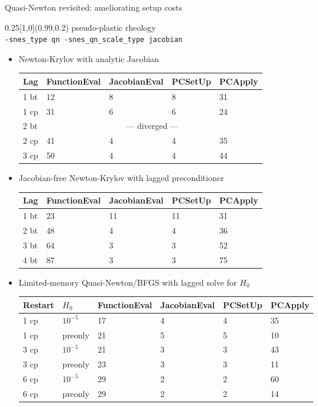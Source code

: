 \begin{frame}[shrink=5]{Quasi-Newton revisited: ameliorating setup costs}
  \begin{textblock}{0.25}[1,0](0.99,0.2)
    {\small pseudo-plastic rheology} \\
    {\scriptsize
      \texttt{-snes\_type qn
        -snes\_qn\_scale\_type jacobian}}
  \end{textblock}

    \begin{itemize}
    \item Newton-Krylov with analytic Jacobian
{\footnotesize
      \begin{tabular}{lllll}
        \toprule
        Lag & FunctionEval & JacobianEval & PCSetUp & PCApply \\
        \midrule
        1 bt & 12 & 8 & 8 & 31 \\
        1 cp & 31 & 6 & 6 & 24 \\
        2 bt & \multicolumn{4}{c}{--- diverged ---} \\
        2 cp & 41 & 4 & 4 & 35 \\
        3 cp & 50 & 4 & 4 & 44 \\
        \bottomrule
      \end{tabular}
}
    \item Jacobian-free Newton-Krylov with lagged preconditioner
{\footnotesize
      \begin{tabular}{lllll}
        \toprule
        Lag & FunctionEval & JacobianEval & PCSetUp & PCApply \\
        \midrule
        1 bt & 23 & 11 & 11 & 31 \\
        2 bt & 48 & 4 & 4 & 36 \\
        3 bt & 64 & 3 & 3 & 52 \\
        4 bt & 87 & 3 & 3 & 75 \\
        \bottomrule
      \end{tabular}
}
    \item Limited-memory Quasi-Newton/BFGS with lagged solve for $H_0$
{\footnotesize
      \begin{tabular}{llllll}
        \toprule
        Restart & $H_0$ & FunctionEval & JacobianEval & PCSetUp & PCApply \\
        \midrule
        1 cp & $10^{-5}$ & 17 & 4 & 4 & 35 \\
        1 cp & preonly & 21 & 5 & 5 & 10 \\
        3 cp & $10^{-5}$ & 21 & 3 & 3 & 43 \\
        3 cp & preonly & 23 & 3 & 3 & 11 \\
        6 cp & $10^{-5}$ & 29 & 2 & 2 & 60 \\
        6 cp & preonly & 29 & 2 & 2 & 14 \\
        \bottomrule
      \end{tabular}
}
    \end{itemize}
\end{frame}
